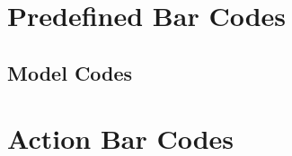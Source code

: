 \documentclass[11pt
  , a4paper
  , article
  , oneside
  , showtrims
]{memoir}
\begin{document}

\newpage
\chapter{Predefined Bar Codes}




\section{Model Codes}
\vspace{1cm}



\newpage
\chapter{Action Bar Codes}
\vspace{1cm}

\end{document}
